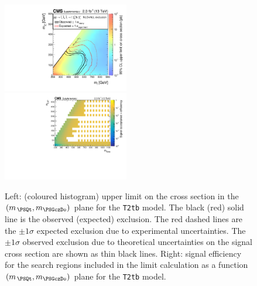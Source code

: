 \clearpage
\begin{figure}[!h]
  \begin{center}
    \includegraphics[width=0.49\textwidth]{RA1T2tbXSEC_aux} \, 
    \includegraphics[width=0.49\textwidth]{T2tb_merging_4_cats_aux} \,     
  \end{center}
  \caption{Left: (coloured histogram) upper limit on the cross section in the $(m_{\,\PSQt}, m_{\PSGczDo})$ plane for the \texttt{T2tb} model. 
  The black (red) solid line is the observed (expected) exclusion. The red dashed lines are the $\pm1\sigma$ expected exclusion due to experimental uncertainties. 
  The $\pm1\sigma$ observed exclusion due to theoretical uncertainties on the signal cross section are shown as thin black lines. 
  Right: signal efficiency for the search regions included in the limit calculation as a function $(m_{\,\PSQt}, m_{\PSGczDo})$ plane for the \texttt{T2tb} model. 
  \label{fig:T2tb_excl}}
\end{figure}



